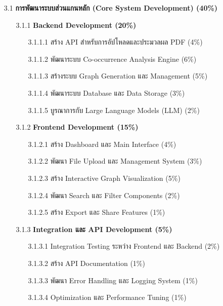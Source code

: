 \documentclass[12pt,a4paper]{article}
\begin{document}
\begin{enumerate}[leftmargin=2cm]
{        \begin{enumerate}
            \item[3.1] \textbf{การพัฒนาระบบส่วนแกนหลัก (Core System Development) (40\%)}
            \begin{enumerate}
                \item[3.1.1] \textbf{Backend Development (20\%)}
                \begin{enumerate}
                    \item[3.1.1.1] สร้าง API สำหรับการอัปโหลดและประมวลผล PDF (4\%)
                    \item[3.1.1.2] พัฒนาระบบ Co-occurrence Analysis Engine (6\%)
                    \item[3.1.1.3] สร้างระบบ Graph Generation และ Management (5\%)
                    \item[3.1.1.4] พัฒนาระบบ Database และ Data Storage (3\%)
                    \item[3.1.1.5] บูรณาการกับ Large Language Models (LLM) (2\%)
                \end{enumerate}
                
                \item[3.1.2] \textbf{Frontend Development (15\%)}
                \begin{enumerate}
                    \item[3.1.2.1] สร้าง Dashboard และ Main Interface (4\%)
                    \item[3.1.2.2] พัฒนา File Upload และ Management System (3\%)
                    \item[3.1.2.3] สร้าง Interactive Graph Visualization (5\%)
                    \item[3.1.2.4] พัฒนา Search และ Filter Components (2\%)
                    \item[3.1.2.5] สร้าง Export และ Share Features (1\%)
                \end{enumerate}
                
                \item[3.1.3] \textbf{Integration และ API Development (5\%)}
                \begin{enumerate}
                    \item[3.1.3.1] Integration Testing ระหว่าง Frontend และ Backend (2\%)
                    \item[3.1.3.2] สร้าง API Documentation (1\%)
                    \item[3.1.3.3] พัฒนา Error Handling และ Logging System (1\%)
                    \item[3.1.3.4] Optimization และ Performance Tuning (1\%)
                \end{enumerate}
            \end{enumerate}
        \end{enumerate}

}
\end{enumerate}
\end{document}

